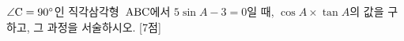 $\angle\mathrm{C}=90^\circ$인 직각삼각형~$\mathrm{ABC}$에서 $5\sin A-3=0$일 때, $\cos A\times\tan A$의 값을 구하고, 그 과정을 서술하시오. \mbox{[7점]}
